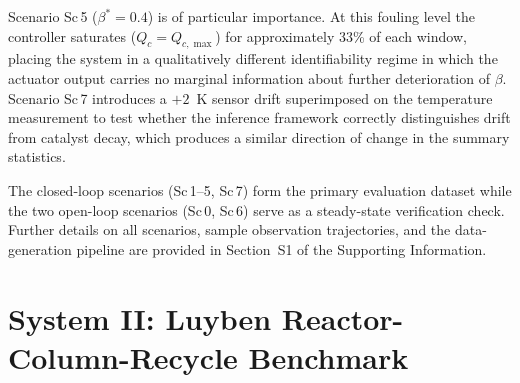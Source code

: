 \documentclass[aps,pre,twocolumn,superscriptaddress]{revtex4-2}
\begin{document}
Scenario Sc\,5 ($\beta^* = 0.4$) is of particular importance. At this fouling level the controller saturates ($Q_c = Q_{c,\max}$) for approximately 33\% of each window, placing the system in a qualitatively different identifiability regime in which the actuator output carries no marginal information about further deterioration of $\beta$.  Scenario Sc\,7 introduces a $+2$~K sensor drift superimposed on the temperature measurement to test whether the inference framework correctly distinguishes drift from
catalyst decay, which produces a similar direction of change in the summary statistics.

The closed-loop scenarios (Sc\,1--5, Sc\,7) form the primary evaluation dataset while the two open-loop scenarios (Sc\,0, Sc\,6) serve as a steady-state verification check. Further details on all scenarios, sample observation trajectories, and the data-generation pipeline are provided in Section~S1 of the Supporting Information.

\section{System II: Luyben Reactor-Column-Recycle Benchmark}
\label{sec:system2}
\end{document}
